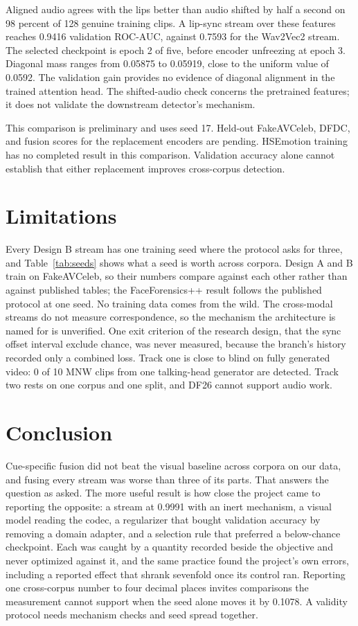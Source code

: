 \documentclass[conference]{IEEEtran}
\begin{document}
Aligned audio agrees with the lips better than audio shifted by half a second
on 98 percent of 128 genuine training clips. A lip-sync stream over these
features reaches 0.9416 validation ROC-AUC, against 0.7593 for the Wav2Vec2
stream. The selected checkpoint is epoch 2 of five, before encoder unfreezing
at epoch 3. Diagonal mass ranges from 0.05875 to 0.05919, close to the uniform
value of 0.0592. The validation gain provides no evidence of diagonal
alignment in the trained attention head. The shifted-audio check concerns the
pretrained features; it does not validate the downstream detector's mechanism.

This comparison is preliminary and uses seed 17. Held-out FakeAVCeleb, DFDC,
and fusion scores for the replacement encoders are pending. HSEmotion training
has no completed result in this comparison. Validation accuracy alone cannot
establish that either replacement improves cross-corpus detection.

\section{Limitations}

Every Design B stream has one training seed where the protocol asks for three,
and Table~\ref{tab:seeds} shows what a seed is worth across corpora. Design A
and B train on FakeAVCeleb, so their numbers compare against each other rather
than against published tables; the FaceForensics++ result follows the
published protocol at one seed. No training data comes from the wild. The
cross-modal streams do not measure correspondence, so the mechanism the
architecture is named for is unverified. One exit criterion of the research
design, that the sync offset interval exclude chance, was never measured,
because the branch's history recorded only a combined loss. Track one is close
to blind on fully generated video: 0 of 10 MNW clips from one talking-head
generator are detected. Track two rests on one corpus and one split, and DF26
cannot support audio work.

\section{Conclusion}

Cue-specific fusion did not beat the visual baseline across corpora on our
data, and fusing every stream was worse than three of its parts. That answers
the question as asked. The more useful result is how close the project came to
reporting the opposite: a stream at 0.9991 with an inert mechanism, a visual
model reading the codec, a regularizer that bought validation accuracy by
removing a domain adapter, and a selection rule that preferred a below-chance
checkpoint. Each was caught by a quantity recorded beside the objective and
never optimized against it, and the same practice found the project's own
errors, including a reported effect that shrank sevenfold once its control
ran. Reporting one cross-corpus number to four decimal places invites
comparisons the measurement cannot support when the seed alone moves it by
0.1078. A validity protocol needs mechanism checks and seed spread together.
\end{document}
